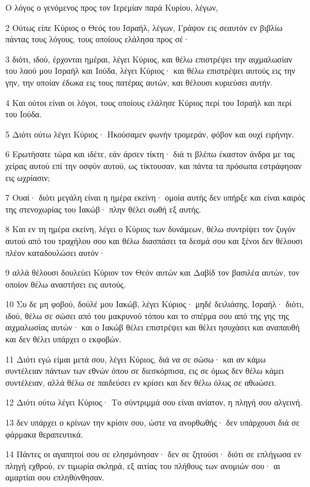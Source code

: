 \par Ο λόγος ο γενόμενος προς τον Ιερεμίαν παρά Κυρίου, λέγων,
\par 2 Ούτως είπε Κύριος ο Θεός του Ισραήλ, λέγων, Γράψον εις σεαυτόν εν βιβλίω πάντας τους λόγους, τους οποίους ελάλησα προς σέ·
\par 3 διότι, ιδού, έρχονται ημέραι, λέγει Κύριος, και θέλω επιστρέψει την αιχμαλωσίαν του λαού μου Ισραήλ και Ιούδα, λέγει Κύριος· και θέλω επιστρέψει αυτούς εις την γην, την οποίαν έδωκα εις τους πατέρας αυτών, και θέλουσι κυριεύσει αυτήν.
\par 4 Και ούτοι είναι οι λόγοι, τους οποίους ελάλησε Κύριος περί του Ισραήλ και περί του Ιούδα.
\par 5 Διότι ούτω λέγει Κύριος· Ηκούσαμεν φωνήν τρομεράν, φόβον και ουχί ειρήνην.
\par 6 Ερωτήσατε τώρα και ιδέτε, εάν άρσεν τίκτη· διά τι βλέπω έκαστον άνδρα με τας χείρας αυτού επί την οσφύν αυτού, ως τίκτουσαν, και πάντα τα πρόσωπα εστράφησαν εις ωχρίασιν;
\par 7 Ουαί· διότι μεγάλη είναι η ημέρα εκείνη· ομοία αυτής δεν υπήρξε και είναι καιρός της στενοχωρίας του Ιακώβ· πλην θέλει σωθή εξ αυτής.
\par 8 Και εν τη ημέρα εκείνη, λέγει ο Κύριος των δυνάμεων, θέλω συντρίψει τον ζυγόν αυτού από του τραχήλου σου και θέλω διασπάσει τα δεσμά σου και ξένοι δεν θέλουσι πλέον καταδουλώσει αυτόν·
\par 9 αλλά θέλουσι δουλεύει Κύριον τον Θεόν αυτών και Δαβίδ τον βασιλέα αυτών, τον οποίον θέλω αναστήσει εις αυτούς.
\par 10 Συ δε μη φοβού, δούλέ μου Ιακώβ, λέγει Κύριος· μηδέ δειλιάσης, Ισραήλ· διότι, ιδού, θέλω σε σώσει από του μακρυνού τόπου και το σπέρμα σου από της γης της αιχμαλωσίας αυτών· και ο Ιακώβ θέλει επιστρέψει και θέλει ησυχάσει και αναπαυθή και δεν θέλει υπάρχει ο εκφοβών.
\par 11 Διότι εγώ είμαι μετά σου, λέγει Κύριος, διά να σε σώσω· και αν κάμω συντέλειαν πάντων των εθνών όπου σε διεσκόρπισα, εις σε όμως δεν θέλω κάμει συντέλειαν, αλλά θέλω σε παιδεύσει εν κρίσει και δεν θέλω όλως σε αθωώσει.
\par 12 Διότι ούτω λέγει Κύριος· Το σύντριμμά σου είναι ανίατον, η πληγή σου αλγεινή.
\par 13 δεν υπάρχει ο κρίνων την κρίσιν σου, ώστε να ανορθωθής· δεν υπάρχουσι διά σε φάρμακα θεραπευτικά.
\par 14 Πάντες οι αγαπητοί σου σε ελησμόνησαν· δεν σε ζητούσι· διότι σε επλήγωσα εν πληγή εχθρού, εν τιμωρία σκληρά, εξ αιτίας του πλήθους των ανομιών σου· αι αμαρτίαι σου επληθύνθησαν.

